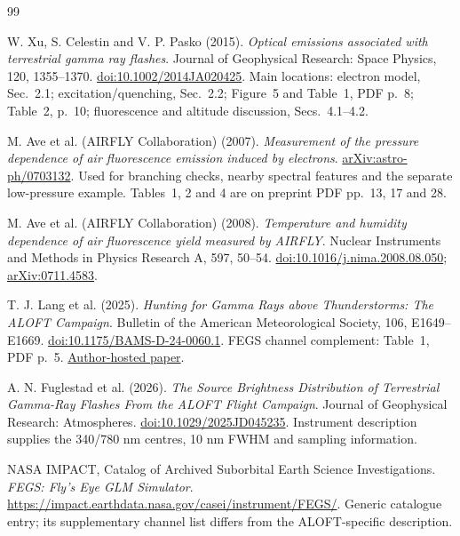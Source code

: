 \documentclass[11pt,a4paper]{article}
\begin{document}
\begin{thebibliography}{99}
\vspace{-12mm}

W. Xu, S. Celestin and V. P. Pasko (2015).
\emph{Optical emissions associated with terrestrial gamma ray flashes}.
Journal of Geophysical Research: Space Physics, 120, 1355--1370.
\href{https://doi.org/10.1002/2014JA020425}{doi:10.1002/2014JA020425}.
Main locations: electron model, Sec.~2.1; excitation/quenching, Sec.~2.2;
Figure~5 and Table~1, PDF p.~8; Table~2, p.~10; fluorescence and altitude discussion, Secs.~4.1--4.2.

M. Ave et al. (AIRFLY Collaboration) (2007).
\emph{Measurement of the pressure dependence of air fluorescence emission induced by electrons}.
\href{https://arxiv.org/abs/astro-ph/0703132}{arXiv:astro-ph/0703132}.
Used for branching checks, nearby spectral features and the separate low-pressure example.
Tables~1, 2 and 4 are on preprint PDF pp.~13, 17 and 28.

M. Ave et al. (AIRFLY Collaboration) (2008).
\emph{Temperature and humidity dependence of air fluorescence yield measured by AIRFLY}.
Nuclear Instruments and Methods in Physics Research A, 597, 50--54.
\href{https://doi.org/10.1016/j.nima.2008.08.050}{doi:10.1016/j.nima.2008.08.050};
\href{https://arxiv.org/abs/0711.4583}{arXiv:0711.4583}.

T. J. Lang et al. (2025).
\emph{Hunting for Gamma Rays above Thunderstorms: The ALOFT Campaign}.
Bulletin of the American Meteorological Society, 106, E1649--E1669.
\href{https://doi.org/10.1175/BAMS-D-24-0060.1}{doi:10.1175/BAMS-D-24-0060.1}.
FEGS channel complement: Table~1, PDF p.~5.
\href{https://www.david-sarria.com/pdf/Lang2025hunting.pdf}{Author-hosted paper}.

A. N. Fuglestad et al. (2026).
\emph{The Source Brightness Distribution of Terrestrial Gamma-Ray Flashes From the ALOFT Flight Campaign}.
Journal of Geophysical Research: Atmospheres.
\href{https://doi.org/10.1029/2025JD045235}{doi:10.1029/2025JD045235}.
Instrument description supplies the 340/780 nm centres, 10 nm FWHM and sampling information.

NASA IMPACT, Catalog of Archived Suborbital Earth Science Investigations.
\emph{FEGS: Fly's Eye GLM Simulator}.
\url{https://impact.earthdata.nasa.gov/casei/instrument/FEGS/}.
Generic catalogue entry; its supplementary channel list differs from the ALOFT-specific description.


\end{thebibliography}
\end{document}
